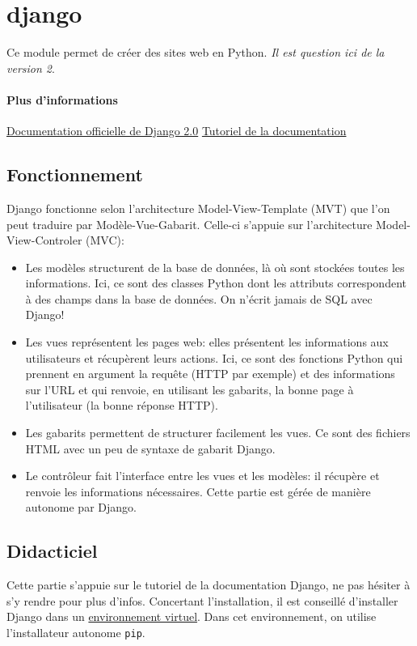 \documentclass[a4paper, 10pt]{article}
\begin{document}
\section{django}
Ce  module permet de créer des sites web en Python. \emph{Il est question ici de la version 2}.
\paragraph{Plus d'informations} \href{https://docs.djangoproject.com/fr/2.0/}{Documentation officielle de Django 2.0} \href{https://docs.djangoproject.com/fr/2.0/intro/}{Tutoriel de la documentation}

\subsection{Fonctionnement}

Django fonctionne selon l'architecture Model-View-Template (MVT) que l'on peut traduire par Modèle-Vue-Gabarit. Celle-ci s’appuie sur l'architecture Model-View-Controler (MVC):
\begin{itemize}
	\item Les modèles structurent de la base de données, là où sont stockées toutes les informations. Ici, ce sont des classes Python dont les attributs correspondent à des champs dans la base de données. On n'écrit jamais de SQL avec Django!
	\item Les vues représentent les pages web: elles présentent les informations aux utilisateurs et récupèrent leurs actions. Ici, ce sont des fonctions Python qui prennent en argument la requête (HTTP par exemple) et des informations sur l’URL et qui renvoie, en utilisant les gabarits, la bonne page à l'utilisateur (la bonne réponse HTTP).
	\item Les gabarits permettent de structurer facilement les vues. Ce sont des fichiers HTML avec un peu de syntaxe de gabarit Django.
	\item Le contrôleur fait l'interface entre les vues et les modèles: il récupère et renvoie les informations nécessaires. Cette partie est gérée de manière autonome par Django.
\end{itemize}

\subsection{Didacticiel}
Cette partie s'appuie sur le tutoriel de la documentation Django, ne pas hésiter à s'y rendre pour plus d'infos. Concertant l'installation, il est conseillé d'installer Django dans un \hyperref[virtualenv]{environnement virtuel}. Dans cet environnement, on utilise l'installateur autonome \texttt{pip}.
\end{document}
